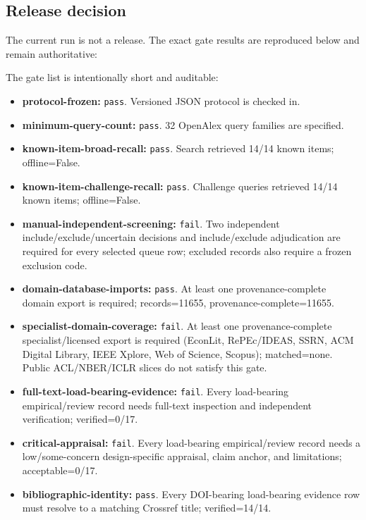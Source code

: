 \documentclass[11pt]{article}
\providecommand{\tightlist}{\setlength{\itemsep}{0pt}\setlength{\parskip}{0pt}}
\begin{document}
\hypertarget{release-decision}{%
\subsection{Release decision}\label{release-decision}}

The current run is not a release. The exact gate results are reproduced below and remain authoritative:

The gate list is intentionally short and auditable:

\begin{itemize}
\tightlist
\item
  \textbf{protocol-frozen:} \texttt{pass}. Versioned JSON protocol is checked in.
\item
  \textbf{minimum-query-count:} \texttt{pass}. 32 OpenAlex query families are specified.
\item
  \textbf{known-item-broad-recall:} \texttt{pass}. Search retrieved 14/14 known items; offline=False.
\item
  \textbf{known-item-challenge-recall:} \texttt{pass}. Challenge queries retrieved 14/14 known items; offline=False.
\item
  \textbf{manual-independent-screening:} \texttt{fail}. Two independent include/exclude/uncertain decisions and include/exclude adjudication are required for every selected queue row; excluded records also require a frozen exclusion code.
\item
  \textbf{domain-database-imports:} \texttt{pass}. At least one provenance-complete domain export is required; records=11655, provenance-complete=11655.
\item
  \textbf{specialist-domain-coverage:} \texttt{fail}. At least one provenance-complete specialist/licensed export is required (EconLit, RePEc/IDEAS, SSRN, ACM Digital Library, IEEE Xplore, Web of Science, Scopus); matched=none. Public ACL/NBER/ICLR slices do not satisfy this gate.
\item
  \textbf{full-text-load-bearing-evidence:} \texttt{fail}. Every load-bearing empirical/review record needs full-text inspection and independent verification; verified=0/17.
\item
  \textbf{critical-appraisal:} \texttt{fail}. Every load-bearing empirical/review record needs a low/some-concern design-specific appraisal, claim anchor, and limitations; acceptable=0/17.
\item
  \textbf{bibliographic-identity:} \texttt{pass}. Every DOI-bearing load-bearing evidence row must resolve to a matching Crossref title; verified=14/14.

\end{itemize}
\end{document}

